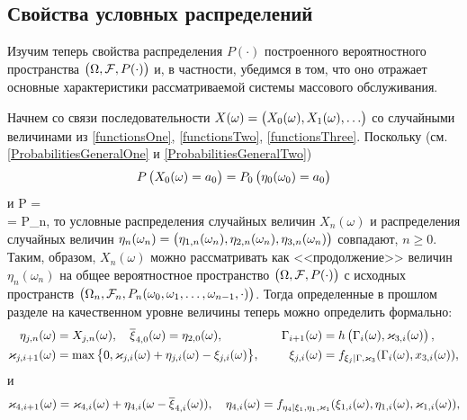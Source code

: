 \documentclass[a4paper,12pt,russian]{extarticle}
\newcommand{\G}{\Gamma}
\renewcommand{\P}[2]{P\br{\left. #1 \right| #2}}
\begin{document}
\subsection{Свойства условных распределений}
Изучим теперь свойства распределения $P(\cdot)$ построенного вероятностного пространства $\left(\Omega,{\cal F},P(\cdot)\right)$ и, в частности, убедимся в том, что оно отражает основные характеристики рассматриваемой системы массового обслуживания.

Начнем со связи последовательности $X(\omega)=\left(X_0(\omega), X_1(\omega),\ldots\right)$ со случайными величинами из \eqref{functionsOne}, \eqref{functionsTwo}, \eqref{functionsThree}. Поскольку (см. \eqref{ProbabilitiesGeneralOne} и \eqref{ProbabilitiesGeneralTwo}) 
\begin{equation*}
P\left(X_0(\omega)=a_0\right) = P_0\left(\eta_0(\omega_0)=a_0\right) 
\end{equation*}
и
\mll
{\P{X_n(\omega)=a_n}{X_0(\omega) = a_0, X_1(\omega)=a_1,\ldots, X_{n-1}(\omega)=a_{n-1}} = \\
= P_n,
}
то условные распределения случайных величин $X_n(\omega)$ и распределения случайных величин $\eta_n(\omega_n)=\left(\eta_{1,n}(\omega_n),\eta_{2,n}(\omega_n),\eta_{3,n}(\omega_n)\right)$ совпадают, $n\geqslant 0$. Таким, образом, $X_n(\omega)$ можно рассматривать как <<продолжение>> величин $\eta_n(\omega_n)$ на общее вероятностное пространство $\left(\Omega,{\cal F},P(\cdot)\right)$ с исходных пространств $\left(\Omega_n,{\cal F}_n,P_n(\omega_0,\omega_1,\ldots,\omega_{n-1},\cdot)\right)$. Тогда определенные в прошлом разделе на качественном уровне величины теперь можно определить формально:
\begin{equation}
\begin{aligned}
\eta_{j,n}(\omega) &= X_{j,n}(\omega),\quad \overline{\xi}_{4,0}(\omega)=\eta_{2,0}(\omega), & \quad \G_{i+1}(\omega)&=h\br{\G_{i}(\omega),\vk_{3,i}(\omega)},\\
\vk_{j,i+1}(\omega)&=\max{\left\{ 0,\vk_{j,i}(\omega)+\eta_{j,i}(\omega) - \xi_{j,i}(\omega)\right\}},& \quad
\xi_{j,i}(\omega)&=f_{\xi_j | \G,\vk_3} (\G_i(\omega),x_{3,i}(\omega)),
\end{aligned}
\label{RandomVariablesOne}
\end{equation}
и
\begin{equation}
\varkappa_{4,i+1}(\omega)=\varkappa_{4,i}(\omega)+\eta_{4,i}(\omega -\overline{\xi}_{4,i}(\omega)),\quad
\eta_{4,i}(\omega)=f_{\eta_4| \xi_1, \eta_1, \varkappa_1} (\xi_{1,i}(\omega),\eta_{1,i}(\omega),\varkappa_{1,i}(\omega)),
\label{RandomVariablesTwo}
\end{equation}
\end{document}
